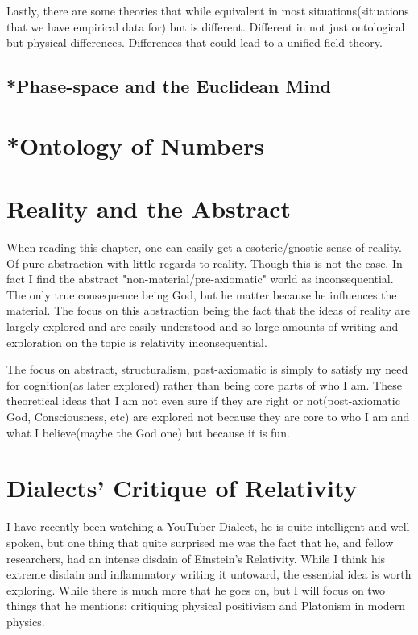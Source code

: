 Lastly, there are some theories that while equivalent in most situations(situations that we have empirical data for) but is different. Different in
not just ontological but physical differences. Differences that could lead to a unified field theory.
\subsection{*Phase-space and the Euclidean Mind}
\section{*Ontology of Numbers}
\section{Reality and the Abstract}
\par When reading this chapter, one can easily get a esoteric/gnostic sense of reality. Of pure abstraction with little regards to reality. Though this is not the case. In fact I find the abstract "non-material/pre-axiomatic" world as inconsequential. The only true consequence being God, but he matter because he influences the material. The focus on this abstraction being the fact that the ideas of reality are largely explored and are easily understood and so large amounts of writing and exploration on the topic is relativity inconsequential.
\par The focus on abstract, structuralism, post-axiomatic is simply to satisfy my need for cognition(as later explored) rather than being core parts of who I am.  These theoretical ideas that I am not even sure if they are right or not(post-axiomatic God, Consciousness, etc) are explored not because they are core to who I am and what I believe(maybe the God one) but because it is fun.
\section{Dialects' Critique of Relativity}

I have recently been watching a YouTuber Dialect, he is quite intelligent and well spoken, but one thing that quite surprised me was the fact that he,
and fellow researchers, had an intense disdain of Einstein's Relativity. While I think his extreme disdain and inflammatory writing it untoward,
the essential idea is worth exploring. While there is much more that he goes on, but I will focus on two things that he mentions; critiquing physical
positivism and Platonism in modern physics.

